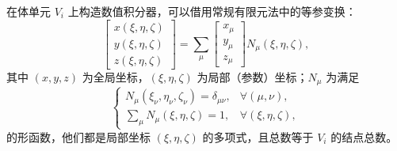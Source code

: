在体单元 $V_{i}$ 上构造数值积分器，可以借用常规有限元法中的等参变换：
\begin{equation}
\begin{bmatrix}x(\xi,\eta,\zeta)\\
y(\xi,\eta,\zeta)\\
z(\xi,\eta,\zeta)
\end{bmatrix}=\sum_{\mu}\begin{bmatrix}x_{\mu}\\
y_{\mu}\\
z_{\mu}
\end{bmatrix}N_{\mu}(\xi,\eta,\zeta),\label{eq:isoparametric}
\end{equation}
其中 $(x,y,z)$ 为全局坐标，$(\xi,\eta,\zeta)$ 为局部（参数）坐标；$N_{\mu}$ 为满足
\begin{equation}
\begin{cases}
N_{\mu}(\xi_{\nu},\eta_{\nu},\zeta_{\nu})=\delta_{\mu\nu}, & \forall(\mu,\nu),\\
\sum_{\mu}N_{\mu}(\xi,\eta,\zeta)=1, & \forall(\xi,\eta,\zeta),
\end{cases}
\end{equation}
的形函数，他们都是局部坐标 $(\xi,\eta,\zeta)$ 的多项式，且总数等于 $V_{i}$ 的结点总数。

\newpage{}

